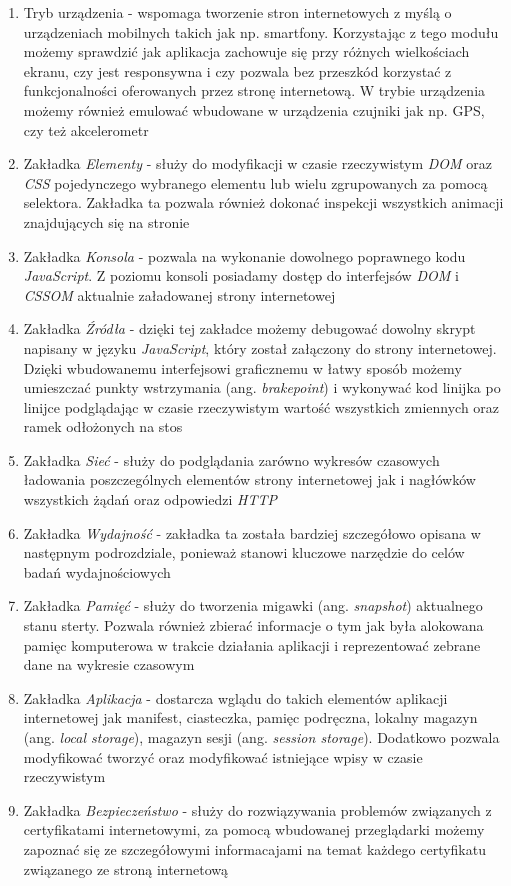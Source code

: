 \documentclass[polish, twoside, 12pt]{mwart}
\begin{document}
\begin{enumerate}
  \item Tryb urządzenia - wspomaga tworzenie stron internetowych z myślą o urządzeniach mobilnych takich jak np. smartfony. Korzystając z tego modułu możemy sprawdzić jak aplikacja zachowuje się przy różnych wielkościach ekranu, czy jest responsywna i czy pozwala bez przeszkód korzystać z funkcjonalności oferowanych przez stronę internetową. W trybie urządzenia możemy również emulować wbudowane w urządzenia czujniki jak np. GPS, czy też akcelerometr
  \item Zakładka \emph{Elementy} - służy do modyfikacji w czasie rzeczywistym \emph{DOM} oraz \emph{CSS} pojedynczego wybranego elementu lub wielu zgrupowanych za pomocą selektora. Zakładka ta pozwala również dokonać inspekcji wszystkich animacji znajdujących się na stronie
  \item Zakładka \emph{Konsola} - pozwala na wykonanie dowolnego poprawnego kodu \emph{JavaScript}. Z poziomu konsoli posiadamy dostęp do interfejsów \emph{DOM} i \emph{CSSOM} aktualnie załadowanej strony internetowej
  \item Zakładka \emph{Źródła} - dzięki tej zakładce możemy debugować dowolny skrypt napisany w języku \emph{JavaScript}, który został załączony do strony internetowej. Dzięki wbudowanemu interfejsowi graficznemu w łatwy sposób możemy umieszczać punkty wstrzymania (ang. \emph{brakepoint}) i wykonywać kod linijka po linijce podglądając w czasie rzeczywistym wartość wszystkich zmiennych oraz ramek odłożonych na stos
  \item Zakładka \emph{Sieć} - służy do podglądania zarówno wykresów czasowych ładowania poszczególnych elementów strony internetowej jak i nagłówków wszystkich żądań oraz odpowiedzi \emph{HTTP}
  \item Zakładka \emph{Wydajność} - zakładka ta została bardziej szczegółowo opisana w następnym podrozdziale, ponieważ stanowi kluczowe narzędzie do celów badań wydajnościowych
  \item Zakładka \emph{Pamięć} - służy do tworzenia migawki (ang. \emph{snapshot}) aktualnego stanu sterty. Pozwala również zbierać informacje o tym jak była alokowana pamięc komputerowa w trakcie działania aplikacji i reprezentować zebrane dane na wykresie czasowym
  \item Zakładka \emph{Aplikacja} - dostarcza wglądu do takich elementów aplikacji internetowej jak manifest, ciasteczka, pamięc podręczna, lokalny magazyn (ang. \emph{local storage}), magazyn sesji (ang. \emph{session storage}). Dodatkowo pozwala modyfikować tworzyć oraz modyfikować istniejące wpisy w czasie rzeczywistym
  \item Zakładka \emph{Bezpieczeństwo} - służy do rozwiązywania problemów związanych z certyfikatami internetowymi, za pomocą wbudowanej przeglądarki możemy zapoznać się ze szczegółowymi informacajami na temat każdego certyfikatu związanego ze stroną internetową
\end{enumerate}
\end{document}
